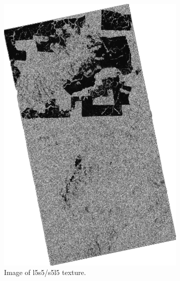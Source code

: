 \begin{figure}[H]
\begin{subfigure}[b]{0.4\linewidth}
    \includegraphics[width=\linewidth]{Chapter4/laws_textures/l5s5_s5l5image.png}
     \caption{Image of l5s5/s5l5 texture.}
  \end{subfigure}
  \centering
  \begin{subfigure}[b]{0.4\linewidth}

\end{subfigure}
\end{figure}
